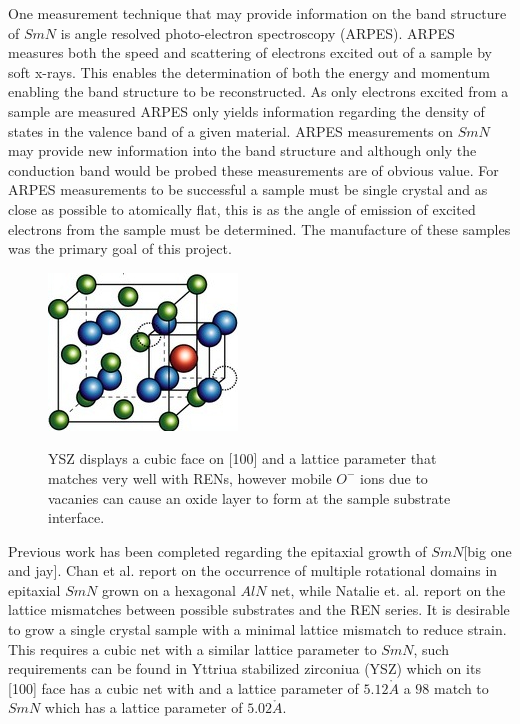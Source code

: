 \documentclass[11pt]{article}
\begin{document}
One measurement technique that may provide information on the band structure of $SmN$ is angle resolved photo-electron spectroscopy (ARPES). ARPES measures both the speed and scattering of electrons excited out of a sample by soft x-rays. This enables the determination of both the energy and momentum enabling the band structure to be reconstructed. As only electrons excited from a sample are measured ARPES only yields information regarding the density of states in the valence band of a given material. 
ARPES measurements on $SmN$ may provide new information into the band structure and although only the conduction band would be probed these measurements are of obvious value. For ARPES measurements to be successful a sample must be single crystal and as close as possible to atomically flat, this is as the angle of emission of excited electrons from the sample must be determined. The manufacture of these samples was the primary goal of this project. 

\begin{figure}[b!]
\center
\includegraphics[width=0.6\linewidth]{YSZ_Wikipedia.png}
\label{fig:boat1}
\caption{YSZ displays a cubic face on [100] and a lattice parameter that matches very well with RENs, however mobile $O^-$ ions due to vacanies can cause an oxide layer to form at the sample substrate interface.}
\end{figure}


Previous work has been completed regarding the epitaxial growth of $SmN$[big one and jay]. Chan et al. report on the occurrence of multiple rotational domains in epitaxial $SmN$ grown on a hexagonal $AlN$ net, while Natalie et. al. report on the lattice mismatches between possible substrates and the REN series. It is desirable to grow a single crystal sample with a minimal lattice mismatch to reduce strain. This requires a cubic net with a similar lattice parameter to $SmN$, such requirements can be found in Yttriua stabilized zirconiua (YSZ) which on its [100] face has a cubic net with and a lattice parameter of $5.12\mathring{A}$ a $98$ match to $SmN$ which has a lattice parameter of $5.02\mathring{A}$.
\end{document}
